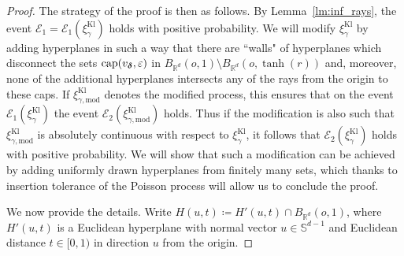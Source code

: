 \documentclass[12pt,a4paper]{article}
\theoremstyle{definition}
\newcommand{\R}{\mathbb{R}}
\begin{document}
\begin{proof}
The strategy of the proof is then as follows. By Lemma~\ref{lm:inf_rays}, the event $\mathcal E_1=\mathcal E_1(\xi_\gamma^\text{Kl})$ holds with positive probability. We will modify $\xi_\gamma^\text{Kl}$ by adding hyperplanes in such a way that there are ``walls" of hyperplanes which disconnect the sets ${\rm cap}(v_{\boldsymbol\delta},\varepsilon)$ in $B_{\mathbb R^d}(o,1)\setminus B_{\R^d}(o,\tanh(r))$ and, moreover, none of the additional hyperplanes intersects any of the rays from the origin to these caps. If $\xi_{\gamma,\text{mod}}^\text{Kl}$ denotes the modified process, this ensures that on the event $\mathcal E_1(\xi_{\gamma}^\text{Kl})$ the event $\mathcal E_2(\xi_{\gamma,\text{mod}}^\text{Kl})$ holds. Thus if the modification is also such that $\xi_{\gamma,\text{mod}}^\text{Kl}$ is absolutely continuous with respect to $\xi_{\gamma}^\text{Kl}$, it follows that $\mathcal E_2(\xi_{\gamma}^\text{Kl})$ holds with positive probability. We will show that such a modification can be achieved by adding uniformly drawn hyperplanes from finitely many sets, which thanks to insertion tolerance of the Poisson process will allow us to conclude the proof.

We now provide the details.
Write $H(u,t) \coloneqq H'(u,t) \cap B_{\R^d}(o,1)$, where $H'(u,t)$ is a Euclidean hyperplane with normal vector $u \in \mathbb{S}^{d-1}$ and Euclidean distance $t \in [0,1)$ in direction $u$ from the origin.


\end{proof}
\end{document}
